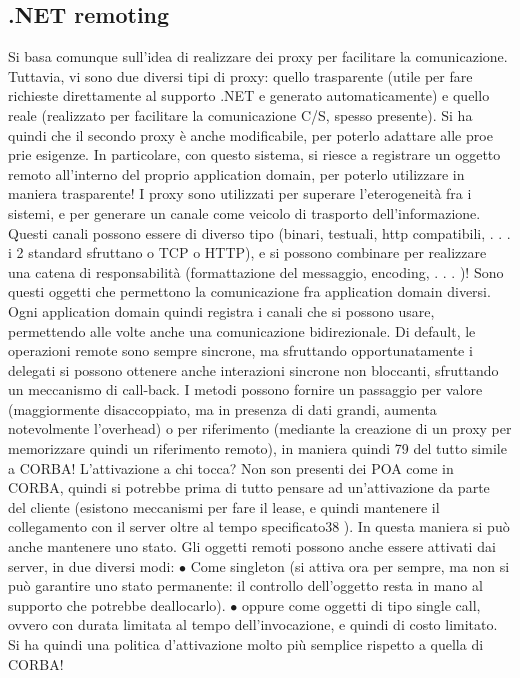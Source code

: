 \subsection{.NET remoting}
Si basa comunque sull'idea di realizzare dei proxy per facilitare la comunicazione.
Tuttavia, vi sono due diversi tipi di proxy: quello trasparente (utile per fare
richieste direttamente al supporto .NET e generato automaticamente) e quello
reale (realizzato per facilitare la comunicazione C/S, spesso presente). Si ha
quindi che il secondo proxy è anche modificabile, per poterlo adattare alle proe
prie esigenze. In particolare, con questo sistema, si riesce a registrare un oggetto remoto all'interno del proprio
application domain, per poterlo utilizzare in
maniera trasparente!
I proxy sono utilizzati per superare l'eterogeneità fra i sistemi, e per generare
un canale come veicolo di trasporto dell'informazione. Questi canali possono essere di diverso tipo (binari, testuali,
http compatibili, . . . i 2 standard sfruttano
o TCP o HTTP), e si possono combinare per realizzare una catena di responsabilità (formattazione del messaggio,
encoding, . . . )! Sono questi oggetti che
permettono la comunicazione fra application domain diversi. Ogni application
domain quindi registra i canali che si possono usare, permettendo alle volte anche una comunicazione bidirezionale.
Di default, le operazioni remote sono sempre sincrone, ma sfruttando opportunatamente i delegati si possono ottenere
anche interazioni sincrone non
bloccanti, sfruttando un meccanismo di call-back. I metodi possono fornire un
passaggio per valore (maggiormente disaccoppiato, ma in presenza di dati grandi, aumenta notevolmente l'overhead) o per
riferimento (mediante la creazione
di un proxy per memorizzare quindi un riferimento remoto), in maniera quindi
79
del tutto simile a CORBA!
L'attivazione a chi tocca? Non son presenti dei POA come in CORBA,
quindi si potrebbe prima di tutto pensare ad un'attivazione da parte del cliente
(esistono meccanismi per fare il lease, e quindi mantenere il collegamento con il
server oltre al tempo specificato38 ). In questa maniera si può anche mantenere
uno stato.
Gli oggetti remoti possono anche essere attivati dai server, in due diversi
modi:
$\bullet$ Come singleton (si attiva ora per sempre, ma non si può garantire uno
stato permanente: il controllo dell'oggetto resta in mano al supporto che
potrebbe deallocarlo).
$\bullet$ oppure come oggetti di tipo single call, ovvero con durata limitata al tempo
dell'invocazione, e quindi di costo limitato.
Si ha quindi una politica d'attivazione molto più semplice rispetto a quella di
CORBA!